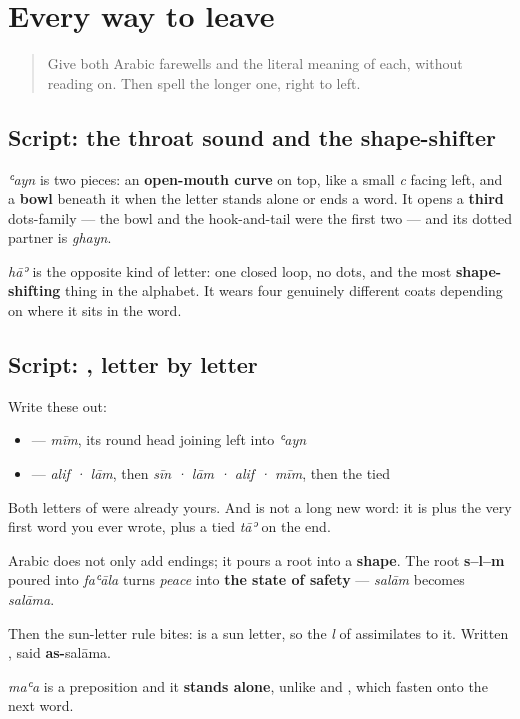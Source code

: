 \section[\texorpdfstring{\ar{مع} \ar{السلامة} · \ar{إلى} … (maʿa s-salāma …)}{مع السلامة · إلى … (maʿa s-salāma …)}]{Every way to leave}

\label{lesson:AR-R24-every-way-to-leave}



\begin{quote}
Give both Arabic farewells and the literal meaning of each, without reading on. Then spell the longer one, right to left.
\end{quote}

\subsection*{Script: the throat sound and the shape-shifter}
\textbf{} \emph{ʿayn} is two pieces: an \textbf{open-mouth curve} on top, like a small \emph{c} facing left, and a \textbf{bowl} beneath it when the letter stands alone or ends a word. It opens a \textbf{third} dots-family — the bowl and the hook-and-tail were the first two — and its dotted partner is \textbf{} \emph{ghayn}.

\textbf{} \emph{hāʾ} is the opposite kind of letter: one closed loop, no dots, and the most \textbf{shape-shifting} thing in the alphabet. It wears four genuinely different coats depending on where it sits in the word.

\subsection*{Script:  , letter by letter}
Write these out:

\begin{itemize}
\raggedright
  \item \textbf{} — \emph{mīm}, its round head joining left into \emph{ʿayn}
  \item \textbf{} — \emph{alif · lām}, then \emph{sīn · lām · alif · mīm}, then the tied \textbf{}
\end{itemize}

Both letters of \textbf{} were already yours. And \textbf{} is not a long new word: it is \textbf{} plus the very first word you ever wrote, plus a tied \emph{tāʾ} on the end.

\begin{grammarlens}[title={Grammar Lens: one pattern, one rule}]
Arabic does not only add endings; it pours a root into a \textbf{shape}. The root \textbf{s–l–m} poured into \emph{faʿāla} turns \emph{peace} into \textbf{the state of safety} — \emph{salām} becomes \emph{salāma}.

Then the sun-letter rule bites: \textbf{} is a sun letter, so the \emph{l} of \textbf{} assimilates to it. Written \textbf{}, said \textbf{as-}salāma.

\textbf{} \emph{maʿa} is a preposition and it \textbf{stands alone}, unlike \textbf{} and \textbf{}, which fasten onto the next word.
\end{grammarlens}

